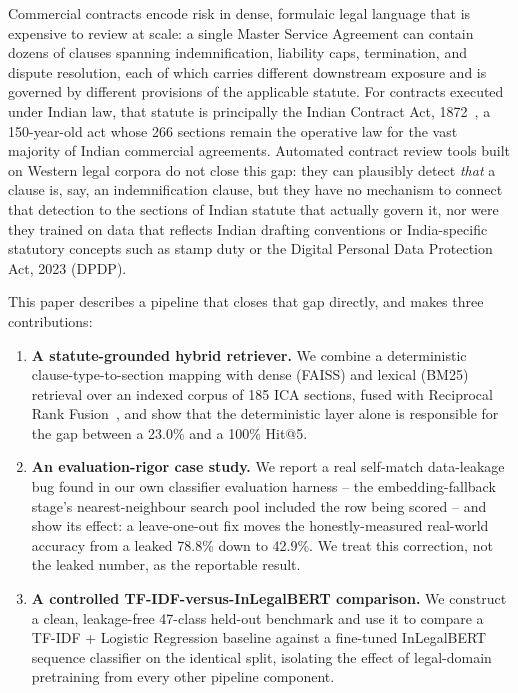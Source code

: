\documentclass[conference]{IEEEtran}
\begin{document}
Commercial contracts encode risk in dense, formulaic legal language that is expensive to review at scale: a single Master Service Agreement can contain dozens of clauses spanning indemnification, liability caps, termination, and dispute resolution, each of which carries different downstream exposure and is governed by different provisions of the applicable statute. For contracts executed under Indian law, that statute is principally the Indian Contract Act, 1872~\cite{ica1872}, a 150-year-old act whose 266 sections remain the operative law for the vast majority of Indian commercial agreements. Automated contract review tools built on Western legal corpora do not close this gap: they can plausibly detect \emph{that} a clause is, say, an indemnification clause, but they have no mechanism to connect that detection to the sections of Indian statute that actually govern it, nor were they trained on data that reflects Indian drafting conventions or India-specific statutory concepts such as stamp duty or the Digital Personal Data Protection Act, 2023 (DPDP).

This paper describes a pipeline that closes that gap directly, and makes three contributions:

\begin{enumerate}
\item \textbf{A statute-grounded hybrid retriever.} We combine a deterministic clause-type-to-section mapping with dense (FAISS) and lexical (BM25) retrieval over an indexed corpus of 185 ICA sections, fused with Reciprocal Rank Fusion~\cite{rrf2009}, and show that the deterministic layer alone is responsible for the gap between a 23.0\% and a 100\% Hit@5.
\item \textbf{An evaluation-rigor case study.} We report a real self-match data-leakage bug found in our own classifier evaluation harness -- the embedding-fallback stage's nearest-neighbour search pool included the row being scored -- and show its effect: a leave-one-out fix moves the honestly-measured real-world accuracy from a leaked 78.8\% down to 42.9\%. We treat this correction, not the leaked number, as the reportable result.
\item \textbf{A controlled TF-IDF-versus-InLegalBERT comparison.} We construct a clean, leakage-free 47-class held-out benchmark and use it to compare a TF-IDF + Logistic Regression baseline against a fine-tuned InLegalBERT~\cite{inlegalbert2023} sequence classifier on the identical split, isolating the effect of legal-domain pretraining from every other pipeline component.
\end{enumerate}
\end{document}
